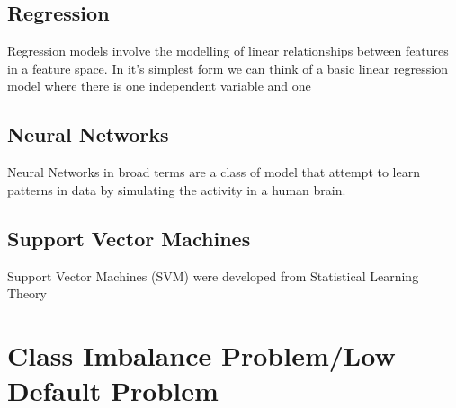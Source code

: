 \subsection{Regression} \label{logicReg}
Regression models involve the modelling of linear relationships between features in a feature space. In it's simplest form we can think of a basic linear regression model where there is one independent variable and one 


\subsection{Neural Networks} \label{neuralNets}
Neural Networks in broad terms are a class of model that attempt to learn patterns in data by simulating the activity in a human brain.


\subsection{Support Vector Machines} \label{SVM}
Support Vector Machines (SVM) were developed from Statistical Learning Theory 

\iffalse
\subsection{Sequential Association Rules, N-grams \& Markov Chains} \label{assosRules}
In their paper, introduce the concept of association rules for discovering statistically significant relationships between frequently occurring items in large datasets. The algorithm.
\subsection{Applications of Techniques in 2-Class Classification \& Path Prediction}\label{applic}
Compared using k-NN versus association rules as an approach to personalising recommendations on websites based on presenting users with pages that they are likely to visit next based on a history of page requests. The results showed that using association rules provided better coverage and precision than k-NN when they used a window of 4 previous page requests.
\fi


\section{Class Imbalance Problem/Low Default Problem}


